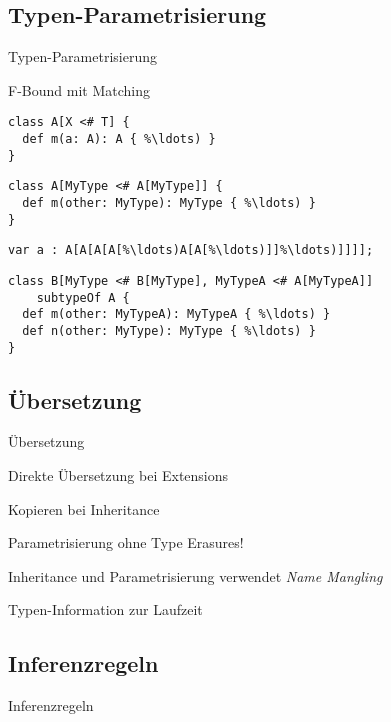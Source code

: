 \subsection{Typen-Parametrisierung}
\begin{frame}{Typen-Parametrisierung}
	\begin{bigitemize}{3mm}
		\item F-Bound mit Matching
	\end{bigitemize}
\end{frame}

\begin{frame}[c,fragile]
\begin{lstlisting}[language=ooplss]
class A[X <# T] {
  def m(a: A): A { %\ldots) }
}
\end{lstlisting}
\pause
\begin{lstlisting}[language=ooplss]
class A[MyType <# A[MyType]] {
  def m(other: MyType): MyType { %\ldots) }
}
\end{lstlisting}
\pause
\begin{lstlisting}[language=ooplss]
var a : A[A[A[A[%\ldots)A[A[%\ldots)]]%\ldots)]]]];
\end{lstlisting}
\pause
\begin{lstlisting}[language=ooplss]
class B[MyType <# B[MyType], MyTypeA <# A[MyTypeA]]
    subtypeOf A {
  def m(other: MyTypeA): MyTypeA { %\ldots) }
  def n(other: MyType): MyType { %\ldots) }
}
\end{lstlisting}
\end{frame}

\subsection{Übersetzung}
\begin{frame}{Übersetzung}
	\begin{bigitemize}{3mm}
		\item Direkte Übersetzung bei Extensions
		\item Kopieren bei Inheritance
		\item Parametrisierung ohne Type Erasures!
		\item Inheritance und Parametrisierung verwendet \emph{Name Mangling}
		\item Typen-Information zur Laufzeit
	\end{bigitemize}
\end{frame}

\subsection{Inferenzregeln}
\begin{frame}{Inferenzregeln}
\end{frame}
